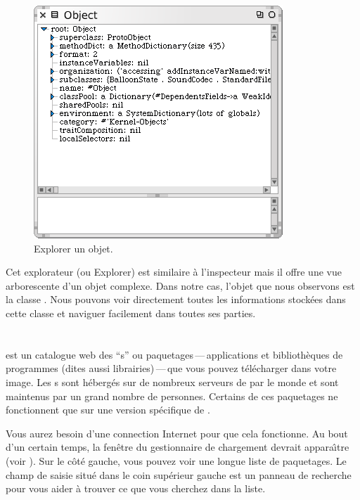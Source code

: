 \documentclass[a4paper,10pt,twoside]{book}
\begin{document}
\begin{figure}[htb]
\centerline {\includegraphics[scale=0.7]{ExploreIt}}
\caption{Explorer un objet.\label{fig:exploreit}}
\end{figure}

Cet explorateur (ou Explorer) est similaire \`a l'inspecteur mais il
offre une vue arborescente d'un objet complexe.
Dans notre cas, l'objet que nous observons est la classe .
Nous pouvons voir directement toutes les informations stock\'ees dans
cette classe et naviguer facilement dans toutes ses parties.

\section{\sqmap}

\sqmap est un catalogue web des ``s'' ou
paquetages\,---\,applications et biblioth\`eques de programmes (dites
aussi librairies)\,---\,que vous pouvez t\'el\'echarger dans votre
image.
Les s sont h\'eberg\'es sur de nombreux serveurs de
par le monde et sont maintenus par un grand nombre de personnes. Certains de ces paquetages ne fonctionnent que sur une version spécifique de \sq.

Vous aurez besoin d'une connection Internet pour que cela
fonctionne. Au bout d'un certain temps, la fen\^etre du gestionnaire
de chargement \sqmap devrait appara\^{\i}tre (voir ).
Sur le c\^ot\'e gauche, vous pouvez voir une longue liste de
paquetages. Le champ de saisie situ\'e dans le coin sup\'erieur gauche
est un panneau de recherche pour vous aider \`a trouver ce que vous
cherchez dans la liste.
\end{document}
